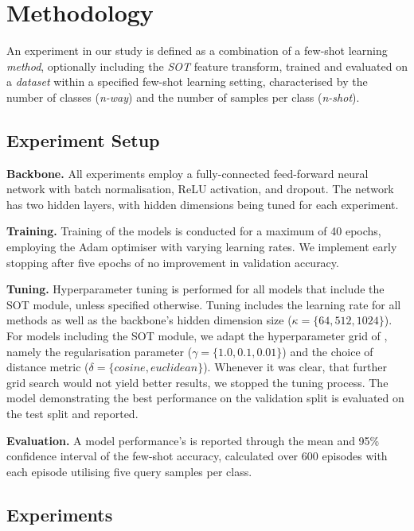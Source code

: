 \section{Methodology}

An experiment in our study is defined as a combination of a few-shot learning \textit{method}, optionally including the \textit{SOT} feature transform, trained and evaluated on a \textit{dataset} within 
a specified few-shot learning setting, characterised by the number of classes (\textit{n-way}) and the number of samples per class (\textit{n-shot}).

\subsection{Experiment Setup}

\textbf{Backbone.} All experiments employ a fully-connected feed-forward neural network with batch normalisation, ReLU activation, and dropout. 
The network has two hidden layers, with hidden dimensions being tuned for each experiment.

\textbf{Training.} Training of the models is conducted for a maximum of 40 epochs, employing the Adam optimiser with varying learning rates. 
We implement early stopping after five epochs of no improvement in validation accuracy. 

\textbf{Tuning.} Hyperparameter tuning is performed for all models that include the SOT module, unless specified otherwise. Tuning includes the learning rate  for all methods as well as the backbone's hidden dimension size ($\kappa = \{64, 512, 1024\}$). For models including the SOT module, we adapt the hyperparameter grid of \citeauthor{sot}, namely the regularisation parameter ($\gamma = \{1.0, 0.1, 0.01\}$) and the choice of distance metric ($\delta = \{cosine, euclidean\}$). Whenever it was clear, that further grid search would not yield better results, we stopped the tuning process. The model demonstrating the best performance on the validation split is evaluated on the test split and reported.

\textbf{Evaluation.} A model performance's is reported through the mean and 95\% confidence interval of the few-shot accuracy, calculated over 600 episodes with each episode utilising five query samples per class.

\subsection{Experiments}

